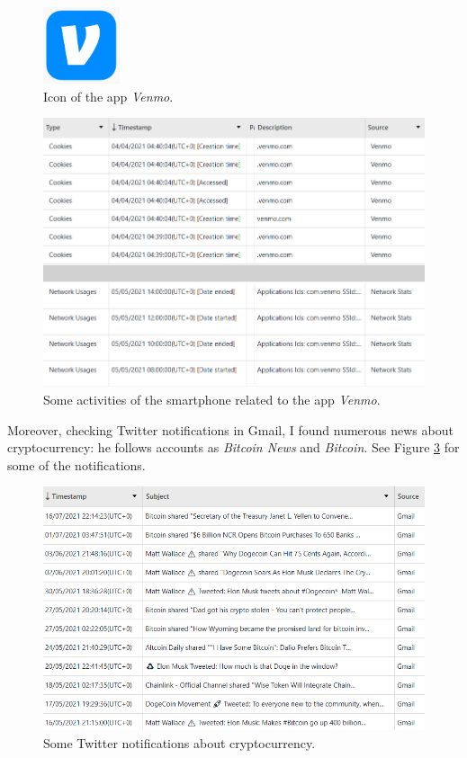 \documentclass[12pt]{article}
\begin{document}
\begin{figure}[!ht]
    \centering
    \includegraphics[width=0.2\textwidth]{images/venmo.png}
    \caption{Icon of the app \textit{Venmo}.}
    \label{fig:venmo-icon}
\end{figure}

\begin{figure}[!ht]
    \centering
    \includegraphics[width=\textwidth]{images/venmo1.png}
    \caption{Some activities of the smartphone related to the app \textit{Venmo}.}
    \label{fig:crypto}
\end{figure}

Moreover, checking Twitter notifications in Gmail, I found numerous news about cryptocurrency: he follows accounts as \textit{Bitcoin News} and \textit{Bitcoin}. See Figure \ref{fig:twitter} for some of the notifications.

\begin{figure}[!ht]
    \centering
    \includegraphics[width=\textwidth]{images/gmail-crypto.png}
    \caption{Some Twitter notifications about cryptocurrency.}
    \label{fig:twitter}
\end{figure}
\end{document}
